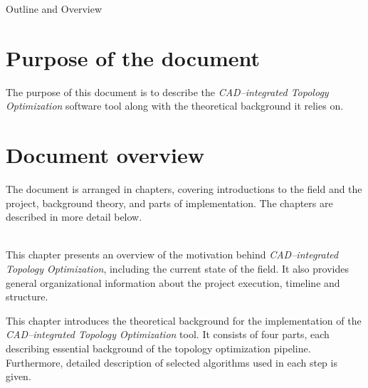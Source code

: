 \clearemptydoublepage

{}

\begin{center}
	\huge{Outline and Overview}
\end{center}




\section*{Purpose of the document}
The purpose of this document is to describe the \emph{CAD--integrated Topology Optimization} software tool along with the theoretical background it relies on.
%

\section*{Document overview}
The document is arranged in chapters, covering introductions to the field and the project, background theory, and parts of implementation. The chapters are described in more detail below.
\\
\\
  \vspace{1mm}

\noindent  This chapter presents an overview of the motivation behind \emph{CAD--integrated Topology Optimization}, including the current state of the field. It also provides general organizational information about the project execution, timeline and structure.
 \\


  \vspace{1mm}

\noindent This chapter introduces the theoretical background for the implementation of the \emph{CAD--integrated Topology Optimization} tool. It consists of four parts, each describing essential background of the topology optimization pipeline. Furthermore, detailed description of selected algorithms used in each step is given.
\\

